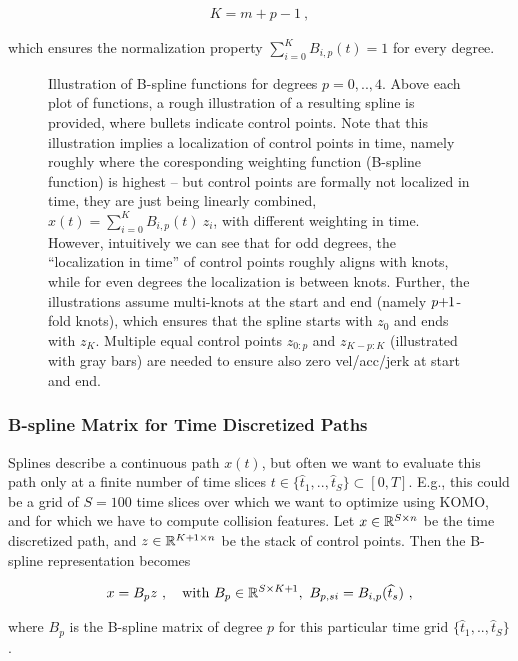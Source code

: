 \begin{align}
    K = m+p-1 ~,
\end{align}

which ensures the normalization property $\sum_{i=0}^K B_{i,p}(t) = 1$ for every degree.

\begin{figure}

\caption{
Illustration of B-spline functions for degrees $p=0,..,4$. Above each
plot of functions, a rough illustration of a resulting spline is
provided, where bullets indicate control points. Note that this
illustration implies a localization of control points in time, namely
roughly where the coresponding weighting function (B-spline function)
is highest -- but control points are formally not localized in time,
they are just being linearly combined, $x(t) = \sum_{i=0}^K
B_{i,p}(t)~ z_i$, with different weighting in time. However,
intuitively we can see that for odd degrees, the ``localization in
time'' of control points roughly aligns with knots, while for even
degrees the localization is between knots. Further, the illustrations
assume multi-knots at the start and end (namely $p{{\hspace*{-.0pt}\text{\rm +}\hspace*{-.5pt}}1}$-fold knots),
which ensures that the spline starts with $z_0$ and ends with
$z_K$. Multiple equal control points $z_{0:p}$ and $z_{K-p:K}$
(illustrated with gray bars) are needed to ensure also zero
vel/acc/jerk at start and end.
}
\end{figure}

\subsubsection{B-spline Matrix for Time Discretized Paths}

Splines describe a continuous path $x(t)$, but often we want to evaluate this path only at a finite number of time slices $t\in \{\hat t_1,..,\hat t_S\} \subset [0,T]$. E.g., this could be a grid of $S=100$ time slices over which we want to optimize using KOMO, and for which we have to compute collision features. Let $x \in {\mathbb{R}}^{S \times n}$ be the time discretized path, and $z \in{\mathbb{R}}^{K{{\hspace*{-.0pt}\text{\rm +}\hspace*{-.5pt}}1}\times n}$ be the stack of control points. Then the B-spline representation becomes

\begin{align}
x = B_p z ~,\quad \text{with } B_p\in{\mathbb{R}}^{S\times K{{\hspace*{-.0pt}\text{\rm +}\hspace*{-.5pt}}1}},~ B_{p,si} = B_{i,p}(\widehat t_s) ~,
\end{align}

where $B_p$ is the B-spline matrix of degree $p$ for this particular time grid $\{\hat t_1,..,\hat t_S\}$.

